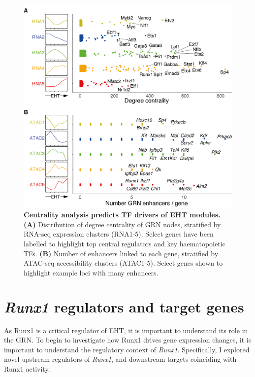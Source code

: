 \begin{figure}[t]
    \centering
    \includegraphics[width=\textwidth,height=\textheight,keepaspectratio]{figures/chapter3/ch3_centrality.png}
    \caption[{Centrality analysis predicts TF drivers of EHT modules.}]
    {\textbf{Centrality analysis predicts TF drivers of EHT modules.} 
    \textbf{(A)} Distribution of degree centrality of GRN nodes, stratified by RNA-seq expression clusters (RNA1-5). Select genes have been labelled to highlight top central regulators and key haematopoietic TFs. 
    \textbf{(B)} Number of enhancers linked to each gene, stratified by ATAC-seq accessibility clusters (ATAC1-5). Select genes shown to highlight example loci with many enhancers. 
    }
    \label{fig:ch3_centrality}
\end{figure}

\section{\label{ch3:runx1-context}\textit{Runx1} regulators and target genes}

As Runx1 is a critical regulator of EHT, it is important to understand its role in the GRN. To begin to investigate how Runx1 drives gene expression changes, it is important to understand the regulatory context of \textit{Runx1}. Specifically, I explored novel upstream regulators of \textit{Runx1}, and downstream targets coinciding with Runx1 activity.

